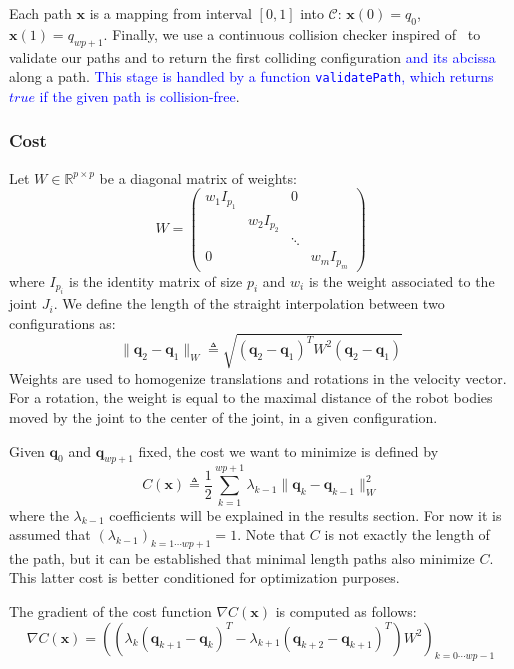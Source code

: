 \documentclass{tADR2e}
\newcommand\real{\mathbb{R}}
\newcommand\CS{\mathcal{C}}
\newcommand\conf{\mathbf{q}}
\newcommand\xx{\mathbf{x}} %
\newcommand\cost{C}
\newcommand\weight{W}
\begin{document}
Each path $\xx$ is a mapping from 
interval $[0,1]$ into $\CS$: $\xx(0) = q_0$, $\xx(1) = q_{wp+1}$.
Finally, we use a continuous 
collision checker inspired of~\cite{SchwarzerExactCollision} to validate our 
paths and to return the first colliding configuration 
\textcolor{blue}{and its abcissa} along a path. \textcolor{blue}{This stage 
is handled by a function \texttt{validatePath}, which returns $true$ if the given path is collision-free}.

\subsubsection{Cost}
Let $W\in\real^{p\times p}$ be a diagonal matrix of weights:
$$
W=\left(\begin{array}{cccccccccc}
w_1 I_{p_1}       &        &  0  \\
    & w_2 I_{p_2} &        &   \\
    &            & \ddots &   \\
  0 &            &        & w_m I_{p_m}
\end{array}\right)
$$
where $I_{p_i}$ is the identity matrix of size $p_i$ and $w_i$ is the weight 
associated to the joint $J_i$. We define the length of the straight interpolation 
between two configurations as:
$$
\|\conf_2 - \conf_1\|_{W} \triangleq \sqrt{(\conf_2 - \conf_1)^T W^2 (\conf_2 - 
\conf_1)}
$$
Weights are used to homogenize translations and rotations in the velocity vector. 
For a rotation, the weight is equal to the maximal distance of the robot bodies 
moved by the joint to the center of the joint, in a given configuration.

Given $\conf_0$ and $\conf_{wp+1}$ fixed, the cost we want to minimize is defined 
by
$$
\cost (\xx) \triangleq \frac{1}{2}\sum_{k=1}^{wp+1} \lambda_{k-1} \|\conf_{k}-\conf_{k-1}\|_{W}
^{2}
$$
where the $\lambda_{k-1}$ coefficients will be explained in the results 
section. For now it is assumed that $(\lambda_{k-1})_{k=1\cdots wp+1}=1$. Note that 
$\cost$ is not exactly the length of the path, but it can be 
established that minimal length paths also minimize $\cost$. This latter cost is 
better conditioned for optimization purposes.

The gradient of the cost function $\nabla \cost (\xx)$ is computed as follows:
$$
\nabla \cost (\xx) = 
\left( (\lambda_{k}(\conf_{k+1} - \conf_{k})^T - \lambda_{k+1}(\conf_{k+2} - \conf_{k+1})^T) \weight^2 \right)_{k=0\cdots wp-1}
$$
\end{document}
